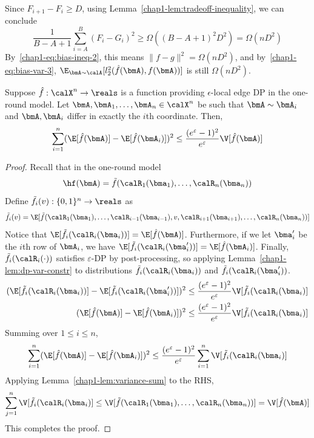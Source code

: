 Since $F_{i+1} - F_i \geq D$, using Lemma~\ref{chap1-lem:tradeoff-inequality}, we can conclude
\[
    \frac{1}{B-A+1} \sum_{i=A}^{B} (F_i - G_i)^2 \geq \Omega((B-A+1)^2 D^2) = \Omega(nD^2)
\]
By~\eqref{chap1-eq:bias-ineq-2}, this means $\|f-g\|^2 = \Omega (nD^2)$, and
by~\eqref{chap1-eq:bias-var-3}, $\E_{\bmA \sim \calA} [l_2^2(\hat{f}(\bmA),f(\bmA))]$ is 
still $\Omega(nD^2)$.

\begin{lemma}\label{chap1-lem:var-to-inf}
Suppose $\hat{f} : \calX^n \rightarrow \reals$ is 
a function providing $\epsilon$-local edge DP in the one-round model. Let $\bmA,\bmA_1,\ldots,
\bmA_n \in \calX^{n}$ be such that $\bmA \sim \bmA_i$ and $\bmA, \bmA_i$ differ
in exactly the $i$th coordinate. Then,
\begin{equation*}
    \sum_{i=1}^n (\E[\hat{f}(\bmA)] - \E[\hat{f}(\bmA_i)])^2 \leq \frac{(e^\varepsilon-1)^2}{e^\varepsilon}\V[\hat{f}(\bmA)]
\end{equation*}

\end{lemma} 
\begin{proof}

Recall that in the one-round model
\[
  \hf(\bmA) = \tilde{f}(\calR_1(\bma_1),\ldots, \calR_n(\bma_n))
\]
Define $\tilde{f}_i(v) : \{0,1\}^n \rightarrow \reals$ as
\[
    \tilde{f}_i(v) = \E[\tilde{f}(\calR_1(\bma_1),\ldots,
    \calR_{i-1}(\bma_{i-1}), v, \calR_{i+1}(\bma_{i+1}), \ldots, \calR_n(\bma_n))]
\]
Notice that $\E[\tilde{f}_i(\calR_i(\bma_i))] = \E[\hat{f}(\bmA)]$. Furthermore,
if we let $\bma_i'$ be the $i$th row of $\bmA_i$, we have
$\E[\tilde{f}_i(\calR_i(\bma_i'))] = \E[\hat{f}(\bmA_i)]$. Finally,
$\tilde{f}_i(\calR_i(\cdot))$ satisfies $\varepsilon$-DP by post-processing, so
applying Lemma~\ref{chap1-lem:dp-var-constr} to distributions
$\tilde{f}_i(\calR_i(\bma_i))$ and $\tilde{f}_i(\calR_i(\bma_i'))$.
\begin{align*}
  (\E[\tilde{f}_i(\calR_i(\bma_i))] - \E[\tilde{f}_i(\calR_i(\bma_i'))])^2 
  &\leq \frac{(e^\varepsilon -
  1)^2}{e^\varepsilon} \V[\tilde{f}_i(\calR_i(\bma_i)] \\
  (\E[\hat{f}(\bmA)] - \E[\hat{f}(\bmA_i)])^2 &\leq \frac{(e^\varepsilon -
  1)^2}{e^\varepsilon} \V[\tilde{f}_i(\calR_i(\bma_i)]
\end{align*}
Summing over $1 \leq i \leq n$,
\begin{align*}
\sum_{i=1}^n (\E[\hat{f}(\bmA)] - \E[\hat{f}(\bmA_i)])^2 \leq 
  \frac{(e^\varepsilon - 1)^2}{e^\varepsilon} \sum_{i=1}^n
  \V[\tilde{f}_i(\calR_i(\bma_i)] 
\end{align*}
Applying Lemma~\ref{chap1-lem:variance-sum} to the RHS,
\begin{align*}
    \sum_{j=1}^n \V[\tilde{f}_i(\calR_i(\bma_i)] \leq
      \V[\tilde{f}(\calR_1(\bma_1), \ldots, \calR_n(\bma_n))] = \V[\hat{f}(\bmA)]
\end{align*}
This completes the proof.
\end{proof}

